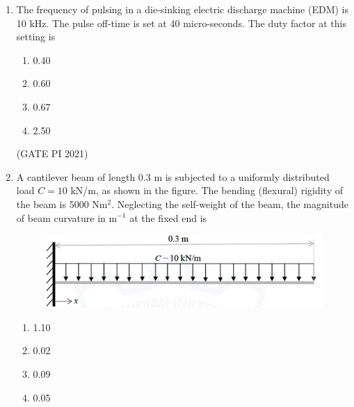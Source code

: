 \documentclass[journal,12pt,onecolumn]{IEEEtran}
\theoremstyle{remark}
\begin{document}
\begin{enumerate}


\begin{multicols}{4}
\begin{enumerate}
\item P-4, Q-1, R-2, S-3
\item P-1, Q-3, R-4, S-2
\item P-2, Q-4, R-3, S-1
\item P-4, Q-3, R-1, S-2
\end{enumerate}
\end{multicols}

\hfill (GATE PI 2021)

\item
The frequency of pulsing in a die-sinking electric discharge machine (EDM) is 10 kHz. The pulse off-time is set at 40 micro-seconds. The duty factor at this setting is

\begin{multicols}{4}
\begin{enumerate}
\item 0.40
\item 0.60
\item 0.67
\item 2.50
\end{enumerate}
\end{multicols}
\hfill (GATE PI 2021)

\item
A cantilever beam of length 0.3 m is subjected to a uniformly distributed load $C = 10$ kN/m, as shown in the figure. The bending (flexural) rigidity of the beam is 5000 Nm$^2$. Neglecting the self-weight of the beam, the magnitude of beam curvature in m$^{-1}$ at the fixed end is

\begin{figure}[H]
    \centering
    \includegraphics[width=0.5\columnwidth]{figs/fig4.png}
    \caption{}
    \label{fig:placeholder}
\end{figure} 

\begin{multicols}{4}
\begin{enumerate}
\item 1.10
\item 0.02
\item 0.09
\item 0.05
\end{enumerate}
\end{multicols}


\end{enumerate}
\end{document}
